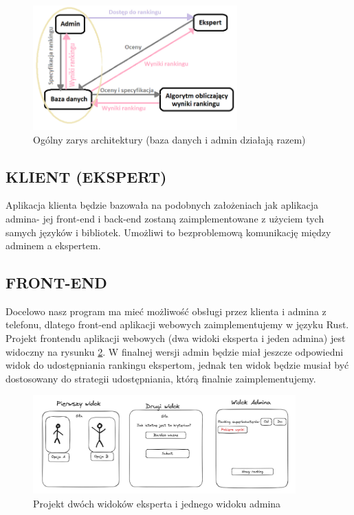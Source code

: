 \documentclass{article}
\begin{document}
\begin{figure}[H]
  \centering
  \includegraphics[width=0.7\textwidth]{Pictures/10000201000002710000017D1497C621F04447B6.png}

  \caption{\label{fig:architecture}Ogólny zarys architektury (baza danych i admin działają
razem)}
\end{figure}

\subsection{KLIENT (EKSPERT)}

Aplikacja klienta będzie bazowała na podobnych założeniach jak aplikacja
admina- jej front-end i back-end zostaną zaimplementowane z użyciem tych
samych języków i bibliotek. Umożliwi to bezproblemową komunikację między
adminem a ekspertem.

\subsection{FRONT-END}

Docelowo nasz program ma mieć możliwość obsługi przez klienta i admina z
telefonu, dlatego front-end aplikacji webowych zaimplementujemy w języku
Rust. Projekt frontendu aplikacji webowych (dwa widoki eksperta i jeden
admina) jest widoczny na rysunku \ref{fig:gui}. W finalnej wersji admin
będzie miał jeszcze odpowiedni widok do udostępniania rankingu
ekspertom, jednak ten widok będzie musiał być dostosowany do strategii
udostępniania, którą finalnie zaimplementujemy.

\begin{figure}[H]
  \centering
  \includegraphics[width=0.9\textwidth]{Pictures/10000201000004180000018B4A3831CB6AABDC44.png}

  \caption{\label{fig:gui}Projekt dwóch widoków eksperta i jednego widoku admina}
\end{figure}
\end{document}
